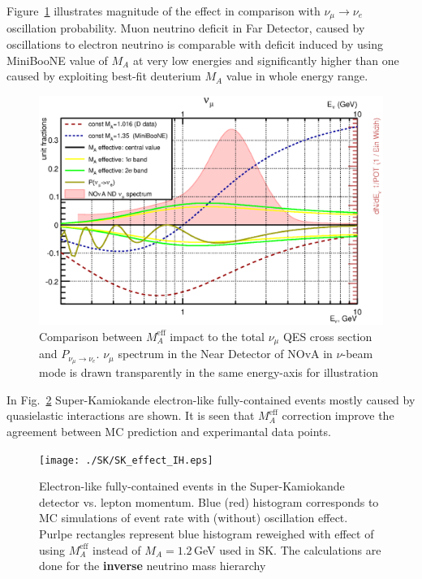 Figure~\ref{NOvAeffect} illustrates magnitude of the effect in comparison with $\nu_{\mu}\to{}\nu_{e}$ oscillation probability. Muon neutrino deficit in Far Detector, caused by oscillations to electron neutrino is comparable with deficit induced by using MiniBooNE value of $M_{A}$ at very low energies and significantly higher than one caused by exploiting best-fit deuterium $M_{A}$ value in whole energy range.

\begin{figure}[htb!]
\includegraphics[width=\textwidth]{./NOvA/Scintillator_nm_n5.eps}
\caption{\label{NOvAeffect}Comparison between $M_{A}^{\mathrm{eff}}$ impact to the total $\nu_{\mu}$ QES cross section and $P_{\nu_{\mu}\to{}\nu_{e}}$. $\nu_{\mu}$ spectrum in the Near Detector of NOvA in $\nu$-beam mode is drawn transparently in the same energy-axis for illustration}
\end{figure}

In Fig.~\ref{SKeffect} Super-Kamiokande electron-like fully-contained events mostly caused by quasielastic interactions are shown. It is seen that $M_{A}^{\mathrm{eff}}$ correction improve the agreement between MC prediction and experimantal data points.

\begin{figure}[h!]
\begin{center}
\texttt{[image: ./SK/SK\_effect\_IH.eps]}
\caption{\label{SKeffect}Electron-like fully-contained events in the Super-Kamiokande detector vs. lepton momentum. Blue (red) histogram corresponds to MC simulations of event rate with (without) oscillation effect. Purlpe rectangles represent blue histogram reweighed with effect of using $M_{A}^{\mathrm{eff}}$ instead of $M_{A}=1.2$\,GeV used in SK. The calculations are done for the \textbf{inverse} neutrino mass hierarchy}
\end{center}
\end{figure}
